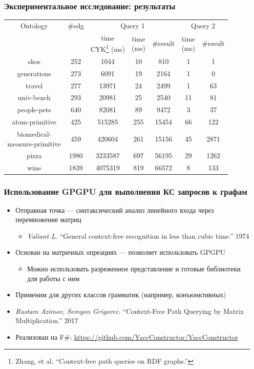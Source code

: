 \documentclass[xcolor=table,aspectratio=169]{beamer}
\begin{document}
\begin{frame}[fragile]
\transwipe[direction=90]
\frametitle{Экспериментальное исследование: результаты}
\centering
{}
\begin{tabular}{  c | c | c | c | c | c | c }
Ontology & \#edg & \multicolumn{3}{c|}{Query 1} & \multicolumn{2}{c}{Query 2} \\
\cline{3-7}
& & \shortstack{time \\ CYK\footnote{Zhang, et al. ``Context-free path queries on RDF graphs.''} (ms)} & \shortstack{time \\ (ms)} & \#result & \shortstack{time \\ (ms)} & \#result \\
\hline 
\hline
skos        & 252  & 1044  & 10 & 810 & 1 & 1 \\
generations & 273  & 6091  & 19 & 2164 & 1 & 0 \\
travel      & 277  & 13971 & 24 & 2499 & 1 & 63 \\
univ-bench  & 293  & 20981 & 25 & 2540 & 11 & 81 \\
people-pets & 640  & 82081 & 89 & 9472 & 3 & 37 \\
atom-primitive & 425 & 515285 & 255 & 15454 & 66 & 122 \\
\shortstack{biomedical- \\ measure-primitive} & 459 & 420604 & 261 & 15156 & 45 & 2871 \\
pizza       & 1980 & 3233587 & 697 & 56195 & 29 & 1262 \\
wine        & 1839 & 4075319 & 819 & 66572 & 8 & 133 \\
\end{tabular}

\end{frame}

\begin{frame}[fragile]
  \transwipe[direction=90]
  \frametitle{Использование GPGPU для выполнения КС запросов к графам}

\begin{itemize} 
\item Отправная точка --- синтаксический анализ линейного входа через перемножение матриц
\begin{itemize}     
  \item \emph{Valiant L.} ``General context-free recognition in less than cubic time.'' 1974
\end{itemize}
\item Основан на матричных опреациях --- позволяет использовать GPGPU
\begin{itemize}     
  \item Можно использовать разреженное представление и готовые библиотеки для работы с ним
\end{itemize}
\item Применим для других классов грамматик (например, конъюнктивных)
\item \emph{Rustam Azimov, Semyon Grigorev.} ``Context-Free Path Querying by Matrix Multiplication.'' 2017
\item Реализован на F\#: \url{https://github.com/YaccConstructor/YaccConstructor}
\end{itemize}
\end{frame}
\end{document}
